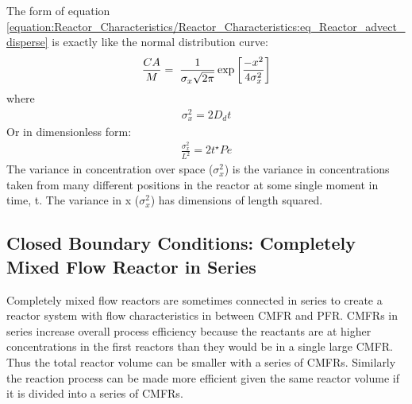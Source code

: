 \documentclass[letterpaper,10pt,english]{sphinxmanual}
\begin{document}
The form of equation \eqref{equation:Reactor_Characteristics/Reactor_Characteristics:eq_Reactor_advect_disperse} is exactly like the normal distribution curve:
\begin{equation}\label{equation:Reactor_Characteristics/Reactor_Characteristics:Reactor_Characteristics/Reactor_Characteristics:8}
\begin{split}\frac{CA}{M} ={\rm \; }\frac{1}{\sigma _{x} \sqrt{2\pi } } \exp \left[\frac{-x^{2} }{4\sigma _{x}^{2} } \right]\end{split}
\end{equation}
where
\begin{equation}\label{equation:Reactor_Characteristics/Reactor_Characteristics:eq_Reactor_sigma_dispersion}
\begin{split}\sigma _{x}^{2} =2D_{d} t\end{split}
\end{equation}
Or in dimensionless form:
\begin{equation}\label{equation:Reactor_Characteristics/Reactor_Characteristics:Reactor_Characteristics/Reactor_Characteristics:9}
\begin{split}\frac{\sigma _{x}^{2} }{L^{2} } =2t^{\star} Pe\end{split}
\end{equation}
The variance in concentration over space (\(\sigma _{x}^{2}\)) is the variance in concentrations taken from many different positions in the reactor at some single moment in time, t. The variance in x (\(\sigma _{x}^{2}\)) has dimensions of length squared.


\subsection{Closed Boundary Conditions: Completely Mixed Flow Reactor in Series}
\label{\detokenize{Reactor_Characteristics/Reactor_Characteristics:closed-boundary-conditions-completely-mixed-flow-reactor-in-series}}
Completely mixed flow reactors are sometimes connected in series to create a reactor system with flow characteristics in between CMFR and PFR. CMFRs in series increase overall process efficiency because the reactants are at higher concentrations in the first reactors than they would be in a single large CMFR. Thus the total reactor volume can be smaller with a series of CMFRs. Similarly the reaction process can be made more efficient given the same reactor volume if it is divided into a series of CMFRs.
\end{document}
